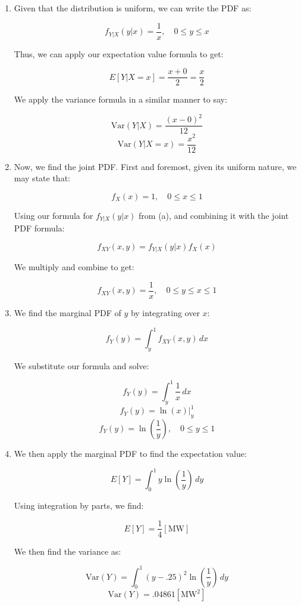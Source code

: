 \begin{enumerate}
\begin{enumerate}
      \item Given that the distribution is uniform, we can write the PDF as:

        $$f_{Y|X}(y|x)=\frac{1}{x},\quad 0\leq y\leq x$$

        Thus, we can apply our expectation value formula to get:

        $$\boxed{E[Y|X=x]=\frac{x+0}{2}=\frac{x}{2}}$$

        We apply the variance formula in a similar manner to say:

        $$\text{Var}(Y|X)=\frac{(x-0)^2}{12}$$
        $$\boxed{\text{Var}(Y|X=x)=\frac{x^2}{12}}$$

      \item Now, we find the joint PDF. First and foremost, given its uniform nature, we may state that:

        $$f_X(x)=1,\quad 0\leq x\leq 1$$

        Using our formula for $f_{Y|X}(y|x)$ from (a), and combining it with the joint PDF formula:

        $$f_{XY}(x,y)=f_{Y|X}(y|x)f_X(x)$$

        We multiply and combine to get:

        $$\boxed{f_{XY}(x,y)=\frac{1}{x},\quad 0\leq y\leq x\leq 1}$$

      \item We find the marginal PDF of $y$ by integrating over $x$:

        $$f_Y(y)=\int_y^1 f_{XY}(x,y)\,dx$$

        We substitute our formula and solve:

        $$f_Y(y)=\int_y^1 \frac{1}{x}\,dx$$
        $$f_Y(y)=\ln(x)\Big|_y^1$$
        $$\boxed{f_Y(y)=\ln\left( \frac{1}{y} \right),\quad 0\leq y\leq 1}$$

      \item We then apply the marginal PDF to find the expectation value:

        $$E[Y]=\int_0^1 y\ln\left( \frac{1}{y} \right)\,dy$$

        Using integration by parts, we find:
        
        $$\boxed{E[Y]=\frac{1}{4}[\si{\mega\watt}]}$$

        We then find the variance as:

        $$\text{Var}(Y)=\int_0^1 (y-.25)^2\ln\left( \frac{1}{y} \right)\,dy$$
        $$\boxed{\text{Var}(Y)=.04861[\si{\mega\watt\squared}]}$$


\end{enumerate}
\end{enumerate}
